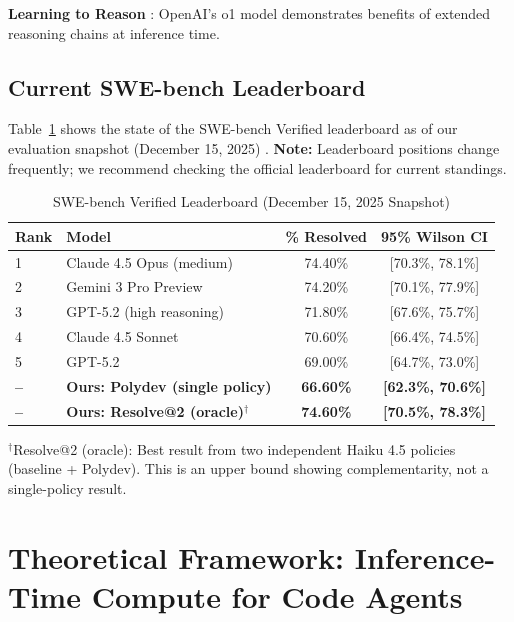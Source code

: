 \documentclass[11pt,a4paper]{article}
\begin{document}
\textbf{Learning to Reason} \citep{openai2024reasoning}: OpenAI's o1 model demonstrates benefits of extended reasoning chains at inference time.

\subsection{Current SWE-bench Leaderboard}

Table~\ref{tab:leaderboard} shows the state of the SWE-bench Verified leaderboard as of our evaluation snapshot (December 15, 2025) \citep{swebenchleaderboard2025}. \textbf{Note:} Leaderboard positions change frequently; we recommend checking the official leaderboard for current standings.

\begin{table}[h]
\centering
\caption{SWE-bench Verified Leaderboard (December 15, 2025 Snapshot) \citep{swebenchleaderboard2025}}
\label{tab:leaderboard}
\begin{tabular}{llcc}
\toprule
\textbf{Rank} & \textbf{Model} & \textbf{\% Resolved} & \textbf{95\% Wilson CI} \\
\midrule
1 & Claude 4.5 Opus (medium) & 74.40\% & [70.3\%, 78.1\%] \\
2 & Gemini 3 Pro Preview & 74.20\% & [70.1\%, 77.9\%] \\
3 & GPT-5.2 (high reasoning) & 71.80\% & [67.6\%, 75.7\%] \\
4 & Claude 4.5 Sonnet & 70.60\% & [66.4\%, 74.5\%] \\
5 & GPT-5.2 & 69.00\% & [64.7\%, 73.0\%] \\
\midrule
\textbf{--} & \textbf{Ours: Polydev (single policy)} & \textbf{66.60\%} & \textbf{[62.3\%, 70.6\%]} \\
\textbf{--} & \textbf{Ours: Resolve@2 (oracle)$^\dagger$} & \textbf{74.60\%} & \textbf{[70.5\%, 78.3\%]} \\
\bottomrule
\end{tabular}
\vspace{0.5em}
\small{$^\dagger$Resolve@2 (oracle): Best result from two independent Haiku 4.5 policies (baseline + Polydev). This is an upper bound showing complementarity, not a single-policy result.}
\end{table}

\section{Theoretical Framework: Inference-Time Compute for Code Agents}
\end{document}
